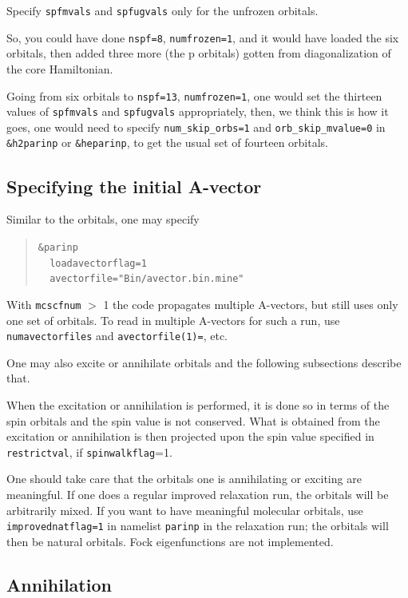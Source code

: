 \documentclass[10pt,leqno, oneside]{book}
\begin{document}
Specify \verb#spfmvals# and \verb#spfugvals# only for the unfrozen orbitals.

So, you could have done \verb#nspf=8#, \verb#numfrozen=1#, and it would have loaded the six orbitals, then added three more (the p orbitals) 
gotten from diagonalization
of the core Hamiltonian.  
  
Going from six orbitals to \verb#nspf=13#, \verb#numfrozen=1#, one would
set the thirteen values of \verb#spfmvals# and \verb#spfugvals# appropriately, then, we think this is how it goes,
one would need to specify \verb#num_skip_orbs=1# and \verb#orb_skip_mvalue=0# in \verb#&h2parinp#
or \verb#&heparinp#, to get the usual set of fourteen orbitals. 

\subsection{Specifying the initial A-vector}

Similar to the orbitals, one may specify
\begin{quote}
{\footnotesize 
\verb#&parinp# \\
\verb#  loadavectorflag=1#\\
\verb#  avectorfile="Bin/avector.bin.mine"#}
\end{quote}

With \verb#mcscfnum# $>$ 1 the code propagates multiple A-vectors, but still uses only one set of orbitals.  
To read in multiple A-vectors for such a 
run, use \verb#numavectorfiles# and \verb#avectorfile(1)=#, etc.  

One may also excite or annihilate orbitals and the following subsections describe that.  

When the excitation or annihilation is performed, it is done so in terms of the spin orbitals and the spin value is not conserved.  What is obtained from the excitation or annihilation is then projected upon the spin value specified in \verb#restrictval#, if \verb#spinwalkflag#=1.

One should take care that the orbitals one is annihilating or exciting are meaningful.  If one does a regular improved relaxation run, the orbitals will
be arbitrarily mixed.  If you want to have meaningful molecular orbitals, use \verb#improvednatflag=1#
in namelist \verb#parinp# in the relaxation run; the orbitals will then be natural orbitals.  Fock eigenfunctions are not implemented. 




\subsection{Annihilation}
\end{document}
